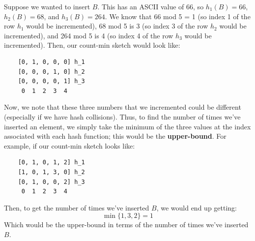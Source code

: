 \documentclass[letterpaper]{article}
\begin{document}
\bigskip

Suppose we wanted to insert $B$. This has an ASCII value of 66, so $h_{1}(B) = 66$, $h_{2}(B) = 68$, and $h_{3}(B) = 264$. We know that 66 mod 5 = 1 (so index 1 of the row $h_1$ would be incremented), 68 mod 5 is 3 (so index 3 of the row $h_2$ would be incremented), and 264 mod 5 is 4 (so index 4 of the row $h_3$ would be incremented). Then, our count-min sketch would look like: 
\begin{verbatim}
    [0, 1, 0, 0, 0] h_1
    [0, 0, 0, 1, 0] h_2
    [0, 0, 0, 0, 1] h_3
     0  1  2  3  4
\end{verbatim}
Now, we note that these three numbers that we incremented could be different (especially if we have hash collisions). Thus, to find the number of times we've inserted an element, we simply take the minimum of the three values at the index associated with each hash function; this would be the \textbf{upper-bound}. For example, if our count-min sketch looks like: 
\begin{verbatim}
    [0, 1, 0, 1, 2] h_1
    [1, 0, 1, 3, 0] h_2
    [0, 1, 0, 0, 2] h_3
     0  1  2  3  4
\end{verbatim}
Then, to get the number of times we've inserted $B$, we would end up getting:
\[\min\{1, 3, 2\} = 1\]
Which would be the upper-bound in terms of the number of times we've inserted $B$. 
\end{document}
